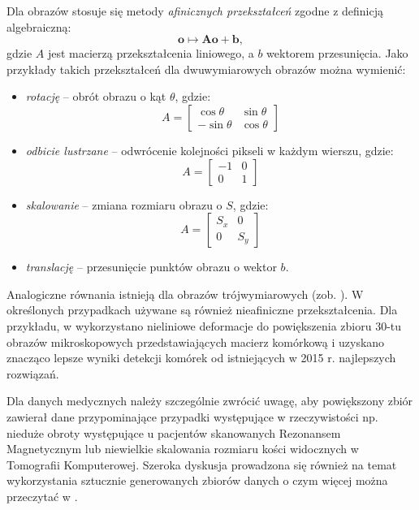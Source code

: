 Dla obrazów stosuje się metody \textit{afinicznych przekształceń} zgodne z definicją algebraiczną:
\begin{equation}
	\mathbf o \mapsto \mathbf{Ao} + \mathbf b,
\end{equation}
gdzie $A$ jest macierzą przekształcenia liniowego, a $b$ wektorem przesunięcia. Jako przykłady takich przekształceń dla dwuwymiarowych obrazów można wymienić:
\begin{itemize}[noitemsep,nolistsep]
	\item \textit{rotację} -- obrót obrazu o kąt $\theta$, gdzie:
	\begin{equation}
	A = \begin{bmatrix} 
	\cos \theta & \sin \theta\\
	-\sin \theta & \cos \theta
	\end{bmatrix}
	\end{equation}	
	\item \textit{odbicie lustrzane} -- odwrócenie kolejności pikseli w każdym wierszu, gdzie:
	\begin{equation}
		A = \begin{bmatrix} 
		-1 & 0\\
		0 & 1
	\end{bmatrix}
	\end{equation}
	\item \textit{skalowanie} -- zmiana rozmiaru obrazu o $S$, gdzie:
	\begin{equation}
			A = \begin{bmatrix} 
		S_x & 0\\
		0 & S_y
	\end{bmatrix}
	\end{equation}
	\item \textit{translację} -- przesunięcie punktów obrazu o wektor $b$.
\end{itemize}

Analogiczne równania istnieją dla obrazów trójwymiarowych (zob. \cite{Hill06}). W określonych przypadkach używane są również nieafiniczne przekształcenia. Dla przykładu, w \cite{DBLP:journals/corr/RonnebergerFB15} wykorzystano nieliniowe deformacje do powiększenia zbioru 30-tu obrazów mikroskopowych przedstawiających macierz komórkową i uzyskano znacząco lepsze wyniki detekcji komórek od istniejących w 2015 r. najlepszych rozwiązań.

Dla danych medycznych należy szczególnie zwrócić uwagę, aby powiększony zbiór zawierał dane przypominające przypadki występujące w rzeczywistości np. nieduże obroty występujące u pacjentów skanowanych Rezonansem Magnetycznym lub niewielkie skalowania rozmiaru kości widocznych w Tomografii Komputerowej. Szeroka dyskusja prowadzona się również na temat wykorzystania sztucznie generowanych zbiorów danych o czym więcej można przeczytać w \cite{DBLP:journals/corr/SixtWL16, Litjens2017}. 

